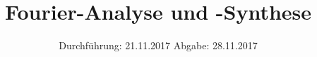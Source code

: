 
\subject{VERSUCH 351}
\title{Fourier-Analyse und -Synthese}
\date{%
  \hspace{-2.5em}
  Durchführung: 21.11.2017
  \hspace{4em}
  Abgabe: 28.11.2017
}


  \setlength{\parindent}{0em}
  \maketitle
  \thispagestyle{empty}
  \newpage
  \tableofcontents
  \newpage





\newpage
\printbibliography{}


